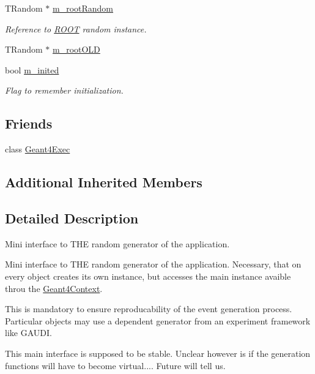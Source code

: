 \begin{DoxyCompactItemize}
T\+Random $\ast$ \hyperlink{class_d_d4hep_1_1_simulation_1_1_geant4_random_a026a1847cc9ce6ae7bae842fa6f4b452}{m\+\_\+root\+Random}
\begin{DoxyCompactList}\small\item\em Reference to \hyperlink{namespace_r_o_o_t}{R\+O\+OT} random instance. \end{DoxyCompactList}\item 
T\+Random $\ast$ \hyperlink{class_d_d4hep_1_1_simulation_1_1_geant4_random_a55a93202818178faaeabd4ae322a208e}{m\+\_\+root\+O\+LD}
\item 
bool \hyperlink{class_d_d4hep_1_1_simulation_1_1_geant4_random_aa8dd0cf1aa819f72ec19b69b6ae171c5}{m\+\_\+inited}
\begin{DoxyCompactList}\small\item\em Flag to remember initialization. \end{DoxyCompactList}\end{DoxyCompactItemize}
\subsection*{Friends}
\begin{DoxyCompactItemize}
\item 
class \hyperlink{class_d_d4hep_1_1_simulation_1_1_geant4_random_ac0f82c2b468e2eec2341f3740273273a}{Geant4\+Exec}
\end{DoxyCompactItemize}
\subsection*{Additional Inherited Members}


\subsection{Detailed Description}
Mini interface to T\+HE random generator of the application. 

Mini interface to T\+HE random generator of the application. Necessary, that on every object creates its own instance, but accesses the main instance avaible throu the \hyperlink{class_d_d4hep_1_1_simulation_1_1_geant4_context}{Geant4\+Context}.

This is mandatory to ensure reproducability of the event generation process. Particular objects may use a dependent generator from an experiment framework like G\+A\+U\+DI.

This main interface is supposed to be stable. Unclear however is if the generation functions will have to become virtual.... Future will tell us.

